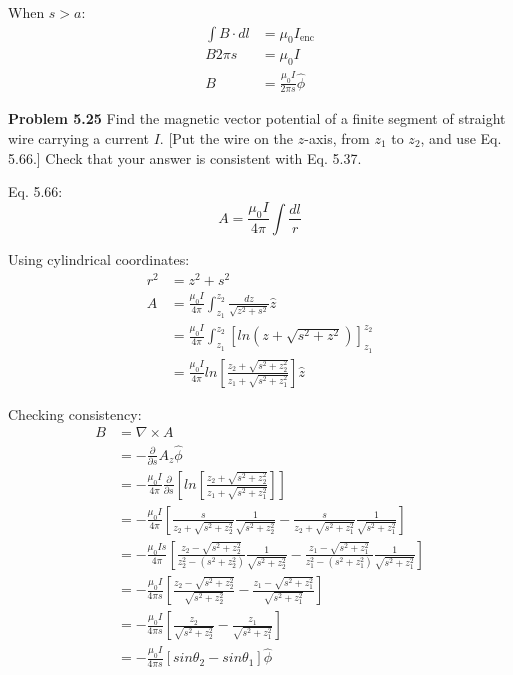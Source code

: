 \documentclass{article}
\begin{document}
When $s > a$:
\begin{equation*}
\begin{split}
	\int B \cdot dl & = \mu_0 I_{\text{enc}} \\
	B 2 \pi s & = \mu_0 I \\
	B & = \boxed{\frac{\mu_0 I}{2 \pi s} \hat{\phi}}
\end{split}
\end{equation*}

\textbf{Problem 5.25}
Find the magnetic vector potential of a finite segment of straight wire carrying a current $I$.
[Put the wire on the $z$-axis, from $z_1$ to $z_2$, and use Eq. 5.66.]
Check that your answer is consistent with Eq. 5.37.

Eq. 5.66:
$$A = \frac{\mu_0 I}{4 \pi} \int \frac{dl}{r}$$

Using cylindrical coordinates:
\begin{equation*}
\begin{split}
	r^2 & = z^2 + s^2 \\
	A & = \frac{\mu_0 I}{4 \pi} \int_{z_1}^{z_2} \frac{dz}{\sqrt{z^2 + s^2}} \hat{z} \\
	& = \frac{\mu_0 I}{4 \pi} \int_{z_1}^{z_2} [ln(z + \sqrt{s^2 + z^2})]_{z_1}^{z_2} \\
	& = \boxed{\frac{\mu_0 I}{4 \pi} ln[\frac{z_2 + \sqrt{s^2 + z_2^2}}{z_1 + \sqrt{s^2 + z_1^2}}] \hat{z}}
\end{split}
\end{equation*}

Checking consistency:
\begin{equation*}
\begin{split}
	B & = \nabla \times A \\
	& = - \frac{\partial}{\partial s} A_z \hat{\phi} \\
	& = - \frac{\mu_0 I}{4 \pi} \frac{\partial}{\partial s} [ln[\frac{z_2 + \sqrt{s^2 + z_2^2}}{z_1 + \sqrt{s^2 + z_1^2}}]] \\
	& = - \frac{\mu_0 I}{4 \pi} [\frac{s}{z_2 + \sqrt{s^2 + z_2^2}} \frac{1}{\sqrt{s^2 + z_2^2}} - \frac{s}{z_2 + \sqrt{s^2 + z_1^2}} \frac{1}{\sqrt{s^2 + z_1^2}}] \\
	& = - \frac{\mu_0 I s}{4 \pi} [\frac{z_2 - \sqrt{s^2 + z_2^2}}{z_2^2 - (s^2 + z_2^2)} \frac{1}{\sqrt{s^2 + z_2^2}} - \frac{z_1 - \sqrt{s^2 + z_1^2}}{z_1^2 - (s^2 + z_1^2)} \frac{1}{\sqrt{s^2 + z_1^2}}] \\
	& = - \frac{\mu_0 I}{4 \pi s} [\frac{z_2 - \sqrt{s^2 + z_2^2}}{\sqrt{s^2 + z_2^2}} - \frac{z_1 - \sqrt{s^2 + z_1^2}}{\sqrt{s^2 + z_1^2}}] \\
	& = - \frac{\mu_0 I}{4 \pi s} [\frac{z_2}{\sqrt{s^2 + z_2^2}} - \frac{z_1}{\sqrt{s^2 + z_1^2}}] \\
	& = \boxed{- \frac{\mu_0 I}{4 \pi s} [sin\theta_2 - sin\theta_1] \hat{\phi}}
\end{split}
\end{equation*}
\end{document}
